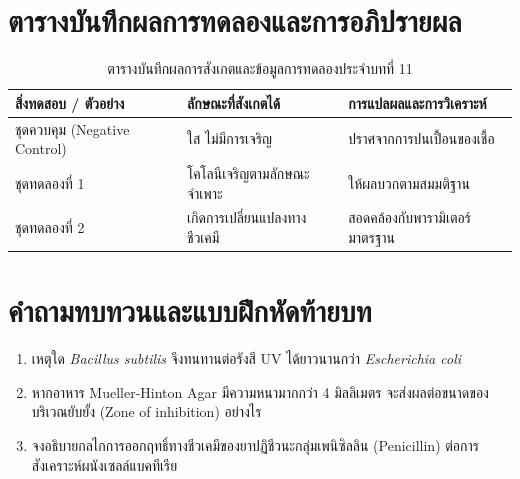 \section{ตารางบันทึกผลการทดลองและการอภิปรายผล}
\begin{table}[H]
\centering\small
\caption{ตารางบันทึกผลการสังเกตและข้อมูลการทดลองประจำบทที่ 11}
\label{tab:ch11_datasheet}
\begin{tabularx}{\textwidth}{p{} p{} X}
\toprule
\textbf{สิ่งทดสอบ / ตัวอย่าง} & \textbf{ลักษณะที่สังเกตได้} & \textbf{การแปลผลและการวิเคราะห์} \\
\midrule
ชุดควบคุม (Negative Control) & ใส ไม่มีการเจริญ & ปราศจากการปนเปื้อนของเชื้อ \\
ชุดทดลองที่ 1 & โคโลนีเจริญตามลักษณะจำเพาะ & ให้ผลบวกตามสมมติฐาน \\
ชุดทดลองที่ 2 & เกิดการเปลี่ยนแปลงทางชีวเคมี & สอดคล้องกับพารามิเตอร์มาตรฐาน \\
\bottomrule
\end{tabularx}
\end{table}

\section{คำถามทบทวนและแบบฝึกหัดท้ายบท}
\begin{enumerate}
    \item เหตุใด \textit{Bacillus subtilis} จึงทนทานต่อรังสี UV ได้ยาวนานกว่า \textit{Escherichia coli}
    \item หากอาหาร Mueller-Hinton Agar มีความหนามากกว่า 4 มิลลิเมตร จะส่งผลต่อขนาดของบริเวณยับยั้ง (Zone of inhibition) อย่างไร
    \item จงอธิบายกลไกการออกฤทธิ์ทางชีวเคมีของยาปฏิชีวนะกลุ่มเพนิซิลลิน (Penicillin) ต่อการสังเคราะห์ผนังเซลล์แบคทีเรีย
\end{enumerate}

